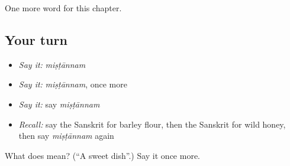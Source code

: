 \begin{grammarlens}[title={What you've built}]
One more word for this chapter.
\end{grammarlens}

\subsection*{Your turn}
\begin{itemize}
\raggedright
  \item \emph{Say it:} \emph{miṣṭānnam}
  \item \emph{Say it:} \emph{miṣṭānnam}, once more
  \item \emph{Say it:} say \emph{miṣṭānnam}
  \item \emph{Recall:} say the Sanskrit for barley flour, then the Sanskrit for wild honey, then say \emph{miṣṭānnam} again
\end{itemize}

\begin{tcolorbox}[breakable,colback=teal!4,colframe=teal!35!black,title={Before you move on}]
What does  mean? (\textquotedblleft{}A sweet dish\textquotedblright{}.) Say it once more.
\end{tcolorbox}
